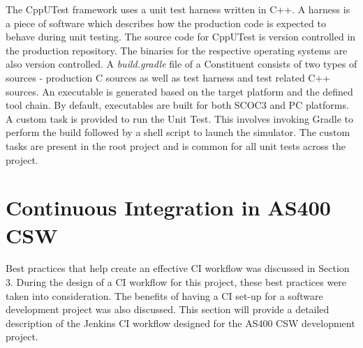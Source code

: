 \documentclass[12pt, a4paper, titlepage]{scrartcl}
\newcommand{\courierword}[1]{\textsf{\itshape #1}}{\fontfamily{pcr}\selectfont}%
\begin{document}
\par The CppUTest framework uses a unit test harness written in C++. A harness is a piece of software which describes how the production code is expected to behave during unit testing. The source code for CppUTest is version controlled in the production repository. The binaries for the respective operating systems are also version controlled. A \courierword{build.gradle} file of a Constituent consists of two types of sources - production C sources as well as test harness and test related C++ sources. An executable is generated based on the target platform and the defined tool chain. By default, executables are built for both SCOC3 and PC platforms. A custom task is provided to run the Unit Test. This involves invoking Gradle to perform the build followed by a shell script to launch the simulator. The custom tasks are present in the root project and is common for all unit tests across the project. 
\pagebreak
\section{Continuous Integration in AS400 CSW}
\par Best practices that help create an effective CI workflow was discussed in Section 3. During the design of a CI workflow for this project, these best practices were taken into consideration. The benefits of having a CI set-up for a software development project was also discussed. This section will provide a detailed description of the Jenkins CI workflow designed for the AS400 CSW development project. 
\end{document}

